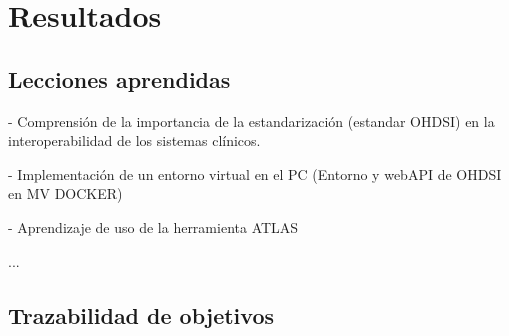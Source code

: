 \chapter{Resultados}\label{cap:09resultados}

\section{Lecciones aprendidas}

- Comprensión de la importancia de la estandarización (estandar OHDSI) en la interoperabilidad de los sistemas clínicos.

- Implementación de un entorno virtual en el PC (Entorno y webAPI de OHDSI en MV DOCKER)

- Aprendizaje de uso de la herramienta ATLAS

...

\section{Trazabilidad de objetivos}